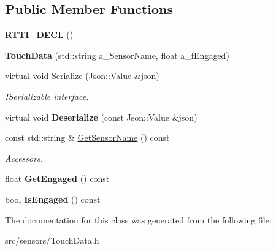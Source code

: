 \subsection*{Public Member Functions}
\begin{DoxyCompactItemize}
\item 
\mbox{\label{class_touch_data_a07d0f1b6624a81490b5f877bf53e9024}} 
{\bfseries R\+T\+T\+I\+\_\+\+D\+E\+CL} ()
\item 
\mbox{\label{class_touch_data_ae3aaf261a5bd7a3f965d2f01523cd8c6}} 
{\bfseries Touch\+Data} (std\+::string a\+\_\+\+Sensor\+Name, float a\+\_\+f\+Engaged)
\item 
\mbox{\label{class_touch_data_aa87b42018d1635c8276cda8d157c63e4}} 
virtual void \hyperlink{class_touch_data_aa87b42018d1635c8276cda8d157c63e4}{Serialize} (Json\+::\+Value \&json)
\begin{DoxyCompactList}\small\item\em I\+Serializable interface. \end{DoxyCompactList}\item 
\mbox{\label{class_touch_data_a4fe71419e2020d64068bbdcc9596d4ef}} 
virtual void {\bfseries Deserialize} (const Json\+::\+Value \&json)
\item 
\mbox{\label{class_touch_data_adf1708f802ec17ffd048fcca7485d3ae}} 
const std\+::string \& \hyperlink{class_touch_data_adf1708f802ec17ffd048fcca7485d3ae}{Get\+Sensor\+Name} () const
\begin{DoxyCompactList}\small\item\em Accessors. \end{DoxyCompactList}\item 
\mbox{\label{class_touch_data_ad566ab4adea612f0c1f43d78947c8285}} 
float {\bfseries Get\+Engaged} () const
\item 
\mbox{\label{class_touch_data_ac41ddf3096624e5bb1801ba67ad14730}} 
bool {\bfseries Is\+Engaged} () const
\end{DoxyCompactItemize}


The documentation for this class was generated from the following file\+:\begin{DoxyCompactItemize}
\item 
src/sensors/Touch\+Data.\+h\end{DoxyCompactItemize}
